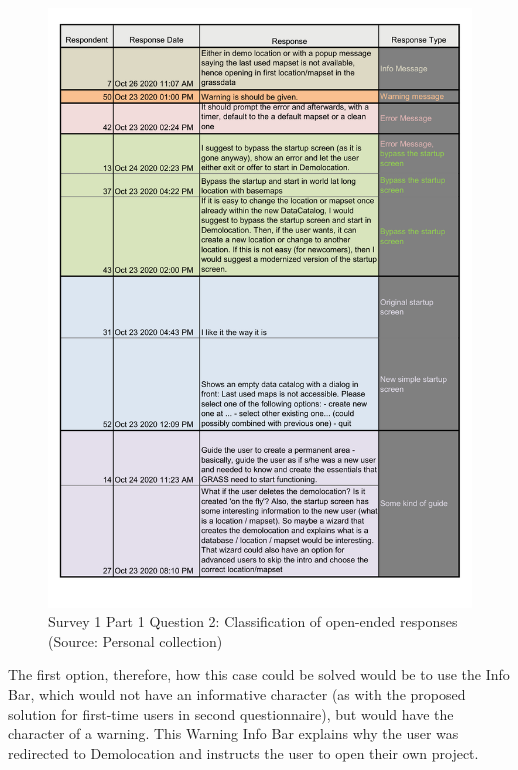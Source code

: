 \documentclass[a4paper,10pt,twoside]{article}
\begin{document}
\vspace{0.3cm}
\begin{figure}[hbt!] 
\begin{center}
\includegraphics[width=15cm]{../surveys/analyzed_data/survey1_part1_question2_other_answers.pdf} 
\caption[Survey 1 Part 1 Question 2: Classification of open-ended responses]{Survey 1 Part 1 Question 2: Classification of open-ended responses (Source: Personal collection)}
\label{fig:survey1_part1_question2_other_answers}
\end{center}
\end{figure}

\noindent The first option, therefore, how this case could be solved would be to use the Info Bar, which would not have an informative character (as with the proposed solution for first-time users in second questionnaire), but would have the character of a warning. This Warning Info Bar explains why the user was redirected to Demolocation and instructs the user to open their own project.
\end{document}
